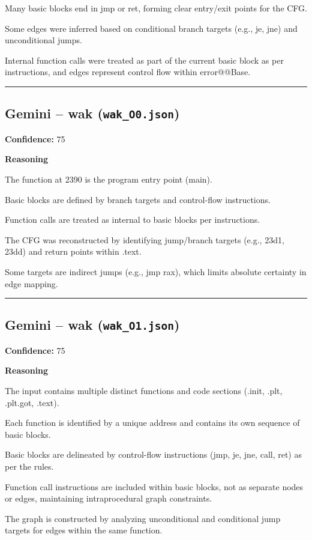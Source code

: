 Many basic blocks end in jmp or ret, forming clear entry/exit points for the CFG.

Some edges were inferred based on conditional branch targets (e.g., je, jne) and unconditional jumps.

Internal function calls were treated as part of the current basic block as per instructions, and edges represent control flow within error@@Base.

\bigskip
\hrule
\bigskip

\subsection{Gemini -- wak (\texttt{wak\_O0.json})}

\textbf{Confidence:} 75

\textbf{Reasoning}

The function at 2390 is the program entry point (main).

Basic blocks are defined by branch targets and control-flow instructions.

Function calls are treated as internal to basic blocks per instructions.

The CFG was reconstructed by identifying jump/branch targets (e.g., 23d1, 23dd) and return points within .text.

Some targets are indirect jumps (e.g., jmp rax), which limits absolute certainty in edge mapping.

\bigskip
\hrule
\bigskip

\subsection{Gemini -- wak (\texttt{wak\_O1.json})}

\textbf{Confidence:} 75

\textbf{Reasoning}

The input contains multiple distinct functions and code sections (.init, .plt, .plt.got, .text).

Each function is identified by a unique address and contains its own sequence of basic blocks.

Basic blocks are delineated by control-flow instructions (jmp, je, jne, call, ret) as per the rules.

Function call instructions are included within basic blocks, not as separate nodes or edges, maintaining intraprocedural graph constraints.

The graph is constructed by analyzing unconditional and conditional jump targets for edges within the same function.

